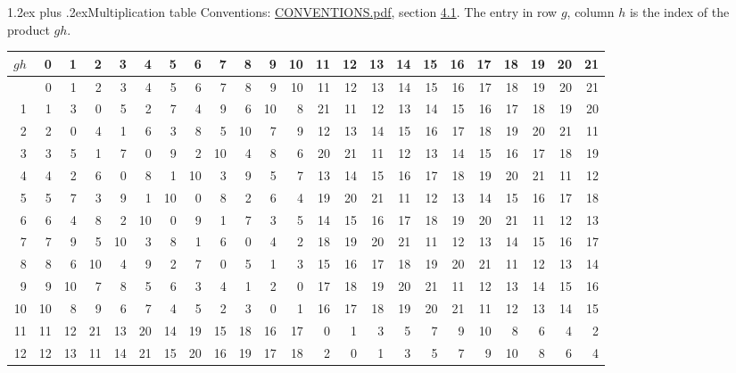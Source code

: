 \documentclass[10pt,a4paper]{article}
\makeatletter
\renewcommand\section{\@startsection{section}{1}{\z@}{-3ex plus -1ex minus -.2ex}%
  {1.2ex plus .2ex}{\normalfont\large\sffamily\bfseries\color{parttitle}}}
\numberwithin{equation}{section}
\makeatother
\begin{document}
\section{Multiplication table}\label{s:multiplication}
Conventions: \href{../../CONVENTIONS.pdf}{CONVENTIONS.pdf}, section \href{../../CONVENTIONS.pdf\#conv.4.1}{4.1}.
The entry in row $g$, column $h$ is the index of the product $gh$.
{\normalsize\setlength{\tabcolsep}{0.1em}\setlength{\LTleft}{-8pt plus 1fill}\setlength{\LTright}{-8pt plus 1fill}\begin{longtable}{@{}r|rrrrrrrrrrrrrrrrrrrrrr@{}}\toprule
$gh$ & 0 & 1 & 2 & 3 & 4 & 5 & 6 & 7 & 8 & 9 & 10 & 11 & 12 & 13 & 14 & 15 & 16 & 17 & 18 & 19 & 20 & 21\\\midrule\endhead
\bottomrule\endfoot\endlastfoot
0 & 0 & 1 & 2 & 3 & 4 & 5 & 6 & 7 & 8 & 9 & 10 & 11 & 12 & 13 & 14 & 15 & 16 & 17 & 18 & 19 & 20 & 21\\*
1 & 1 & 3 & 0 & 5 & 2 & 7 & 4 & 9 & 6 & 10 & 8 & 21 & 11 & 12 & 13 & 14 & 15 & 16 & 17 & 18 & 19 & 20\\
2 & 2 & 0 & 4 & 1 & 6 & 3 & 8 & 5 & 10 & 7 & 9 & 12 & 13 & 14 & 15 & 16 & 17 & 18 & 19 & 20 & 21 & 11\\
3 & 3 & 5 & 1 & 7 & 0 & 9 & 2 & 10 & 4 & 8 & 6 & 20 & 21 & 11 & 12 & 13 & 14 & 15 & 16 & 17 & 18 & 19\\
4 & 4 & 2 & 6 & 0 & 8 & 1 & 10 & 3 & 9 & 5 & 7 & 13 & 14 & 15 & 16 & 17 & 18 & 19 & 20 & 21 & 11 & 12\\
5 & 5 & 7 & 3 & 9 & 1 & 10 & 0 & 8 & 2 & 6 & 4 & 19 & 20 & 21 & 11 & 12 & 13 & 14 & 15 & 16 & 17 & 18\\
6 & 6 & 4 & 8 & 2 & 10 & 0 & 9 & 1 & 7 & 3 & 5 & 14 & 15 & 16 & 17 & 18 & 19 & 20 & 21 & 11 & 12 & 13\\
7 & 7 & 9 & 5 & 10 & 3 & 8 & 1 & 6 & 0 & 4 & 2 & 18 & 19 & 20 & 21 & 11 & 12 & 13 & 14 & 15 & 16 & 17\\
8 & 8 & 6 & 10 & 4 & 9 & 2 & 7 & 0 & 5 & 1 & 3 & 15 & 16 & 17 & 18 & 19 & 20 & 21 & 11 & 12 & 13 & 14\\
9 & 9 & 10 & 7 & 8 & 5 & 6 & 3 & 4 & 1 & 2 & 0 & 17 & 18 & 19 & 20 & 21 & 11 & 12 & 13 & 14 & 15 & 16\\
10 & 10 & 8 & 9 & 6 & 7 & 4 & 5 & 2 & 3 & 0 & 1 & 16 & 17 & 18 & 19 & 20 & 21 & 11 & 12 & 13 & 14 & 15\\
11 & 11 & 12 & 21 & 13 & 20 & 14 & 19 & 15 & 18 & 16 & 17 & 0 & 1 & 3 & 5 & 7 & 9 & 10 & 8 & 6 & 4 & 2\\
12 & 12 & 13 & 11 & 14 & 21 & 15 & 20 & 16 & 19 & 17 & 18 & 2 & 0 & 1 & 3 & 5 & 7 & 9 & 10 & 8 & 6 & 4\\

\end{longtable}}
\end{document}
